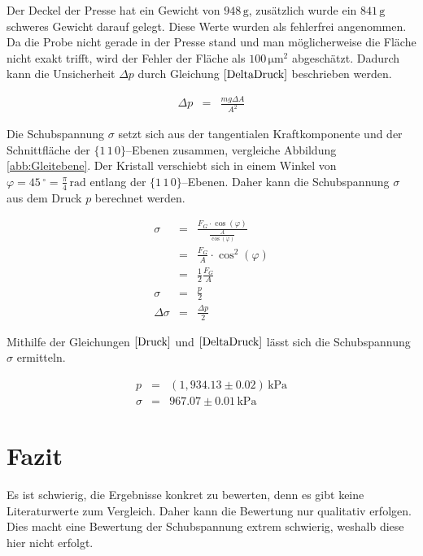 \documentclass[12pt,a4paper]{scrartcl}
\numberwithin{equation}{section} %
\begin{document}
\noindent
Der Deckel der Presse hat ein Gewicht von $948\mathrm{\,g}$, zusätzlich wurde ein $841\mathrm{\,g}$ schweres Gewicht darauf gelegt. Diese Werte wurden als fehlerfrei angenommen. Da die Probe nicht gerade in der Presse stand und man möglicherweise die Fläche nicht exakt trifft, wird der Fehler der Fläche als $100\mathrm{\,\mu m^2}$ abgeschätzt. Dadurch kann die Unsicherheit $\Delta p$ durch Gleichung $\eqref{DeltaDruck}$ beschrieben werden.

\begin{eqnarray}
    \Delta p &=& \frac{mg \Delta A}{A^2} \label{DeltaDruck}
\end{eqnarray}

\noindent
Die Schubspannung $\sigma$ setzt sich aus der tangentialen Kraftkomponente und der Schnittfläche der $\lbrace1\,1\,0\rbrace$--Ebenen zusammen, vergleiche Abbildung \ref{abb:Gleitebene}. Der Kristall verschiebt sich in einem Winkel von $\varphi=45\,^\circ=\frac{\pi}{4}\mathrm{\,rad}$ entlang der $\lbrace1\,1\,0\rbrace$--Ebenen. Daher kann die Schubspannung $\sigma$ aus dem Druck $p$ berechnet werden.

\begin{eqnarray}
    \sigma &=& \frac{F_G \cdot \cos(\varphi)}{\frac{A}{\cos(\varphi)}}\\
        &=&\frac{F_G}{A} \cdot \cos^2(\varphi) \\
        &=& \frac{1}{2}\frac{F_G}{A}\\
    \sigma &=& \frac{p}{2} \\
    \Delta \sigma &=& \frac{\Delta p}{2}
\end{eqnarray}

\noindent
Mithilfe der Gleichungen $\eqref{Druck}$ und $\eqref{DeltaDruck}$ lässt sich die Schubspannung $\sigma$ ermitteln.

\begin{eqnarray}
    p &=& (1,934.13 \pm 0.02) \mathrm{\,kPa} \\
    \sigma &=& 967.07 \pm 0.01 \mathrm{\,kPa}
\end{eqnarray}

\clearpage
\hypertarget{fazit}{%
\section{Fazit}\label{fazit}}

Es ist schwierig, die Ergebnisse konkret zu bewerten, denn es gibt keine Literaturwerte zum Vergleich. Daher kann die Bewertung nur qualitativ erfolgen. Dies macht eine Bewertung der Schubspannung extrem schwierig, weshalb diese hier nicht erfolgt.
\end{document}
